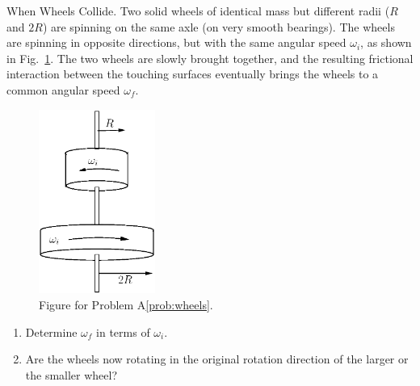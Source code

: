 \begin{aproblem}{When Wheels Collide.}  
  Two solid wheels of identical mass but different radii ($R$ and
  $2R$) are spinning on the same axle (on very smooth bearings).  The
  wheels are spinning in opposite directions, but with the same
  angular speed $\omega_i$, as shown in Fig.~\ref{fig:wheels}.  The
  two wheels are slowly brought together, and the resulting frictional
  interaction between the touching surfaces eventually brings the
  wheels to a common angular speed $\omega_f$.
  \begin{figure}[h]
    \begin{center}
    \includegraphics[width=1.5in]{additional_problems/wheels.eps}
    \end{center}
    \caption{Figure for Problem A\ref{prob:wheels}.}
    \label{fig:wheels}
  \end{figure}
  \begin{enumerate}
  \item Determine $\omega_f$ in terms of $\omega_i$.
  \item Are the wheels now rotating in the original rotation direction
    of the larger or the smaller wheel?
  \end{enumerate}
  \label{prob:wheels}
\end{aproblem}



